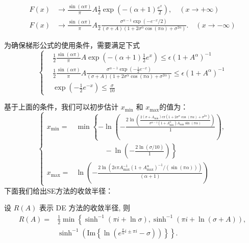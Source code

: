 \begin{equation}
	\begin{aligned}
		F(x) &\rightarrow \frac{\sin(\alpha\pi)}{\pi}A \frac{1}{2} \exp(-(\alpha+1)\frac{e^x}{2}), \quad(x\rightarrow +\infty)\\
		F(x) & \rightarrow \frac{\sin(\alpha\pi)}{\pi}A \frac{}{2} \frac{\sigma^{\alpha-1}\exp(- e^{-x}/2)}{(\sigma+A)(1+2\sigma^{\alpha}\cos(\pi\alpha)+\sigma^{2\alpha})} .\quad(x\rightarrow -\infty)
	\end{aligned}
\end{equation}

为确保梯形公式的使用条件，需要满足下式
\begin{equation}
	\left\{
	\begin{aligned}
		& \frac{1}{2} \frac{\sin(\alpha\pi)}{\pi}A \exp\left(-(\alpha+1)\frac{1}{2}e^x\right)\leq \epsilon (1+A^{\alpha})^{-1}\\
		&\frac{1}{2} \frac{\sin(\alpha\pi)}{\pi}A \frac{\sigma^{\alpha-1}\exp\left(-\frac{1}{2}e^{-x}\right)}{(\sigma+A)(1+2\sigma^{\alpha}\cos(\pi\alpha)+\sigma^{2\alpha})}\leq \epsilon (1+A^{\alpha})^{-1}\\
		&\exp\left(-\frac{1}{2}e^{-x}\right)\le \frac{\sigma}{10}
	\end{aligned}
	\right.
	\label{Conditions_DE0}
\end{equation}

基于上面的条件，我们可以初步估计 $x_{\min}$ 和 $x_{\max}$的值为：
\begin{equation}
	\left\{
	\begin{aligned}
		x_{\min}=&\min \left\{-\ln\left(-\frac{2\ln\left(\frac{2(\sigma+A_{\min})\epsilon\pi (1+2 \sigma^{\alpha}\cos(\pi\alpha)+\sigma^{2\alpha})}{\sigma^{\alpha-1}(1+A_{\min}^{\alpha})A_{\min} \sin(\pi \alpha)} \right)}{1}\right),\right.\\
		&\left. \qquad  \qquad -\ln \left(-\frac{2\ln(\sigma/10)}{1}\right)\right\}\\
		x_{\max}=&\ln\left(-\frac{2\ln(2\epsilon \pi A_{\max}^{-1}(1+A_{\max}^{\alpha})^{-1}/(\sin(\pi \alpha)))}{(\alpha+1)}\right)
	\end{aligned}
	\right.
	\label{findminmax_DE0_q}
\end{equation}
下面我们给出SE方法的收敛半径：
\begin{theorem}
	设 \( R(A) \) 表示 DE 方法的收敛半径, 则 \(\)
	\begin{equation}
		\begin{aligned}
			R(A)=&\frac{1}{2}\min\left\{
			\sinh^{-1}(\pi i+\ln \sigma),\sinh^{-1}(\pi i+\ln(\sigma+A) ),\right.\\
			&\left.\sinh^{-1}\left(\text{Im}\left\{\ln\left(e^{\frac{\pi}{\alpha}i\pm \pi i}-\sigma\right)\right)\right\}
			\right\}.
		\end{aligned}
	\end{equation}
\end{theorem}

